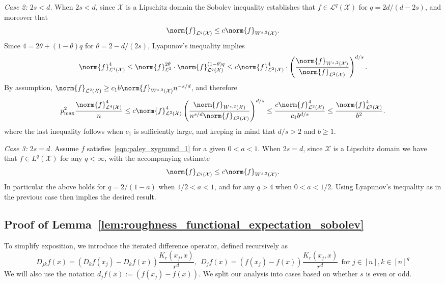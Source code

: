 \documentclass{article}
\newcommand{\1}{\mathbf{1}}
\newcommand{\Xset}{\mathcal{X}}
\newcommand{\Leb}{\mathcal{L}}
\theoremstyle{alden}
\theoremstyle{aldenthm}
\theoremstyle{definition}
\theoremstyle{remark}
\begin{document}
\textit{Case 2: $2s < d$.}
When $2s < d$, since $\Xset$ is a Lipschitz domain the Sobolev inequality establishes that $f \in \Leb^q(\Xset)$ for $q = 2d/(d - 2s)$, and moreover that
\begin{equation*}
\norm{f}_{\Leb^q(\Xset)} \leq c \norm{f}_{W^{s,2}(\Xset)}.
\end{equation*}
Since $4 = 2\theta + (1 - \theta)q$ for $\theta = 2 - d/(2s)$, Lyapunov's inequality implies
\begin{equation*}
\norm{f}_{\Leb^4(\Xset)}^4 \leq \norm{f}_{\Leb^2}^{2\theta} \cdot \norm{f}_{\Leb^q(\Xset)}^{(1 - \theta)q} \leq c \norm{f}_{\Leb^2(\Xset)}^{4} \cdot \left(\frac{\norm{f}_{W^{s,2}(\Xset)}}{\norm{f}_{\Leb^2(\Xset)}}\right)^{d/s}.
\end{equation*}
By assumption, $\norm{f}_{\Leb^2(\Xset)} \geq c_1 b \norm{f}_{W^{s,2}(\Xset)} n^{-s/d}$, and therefore
\begin{equation*}
p_{\max}^2 \frac{\norm{f}_{\Leb^4(\Xset)}^4}{n} \leq c\norm{f}_{\Leb^2(\Xset)}^4 \left(\frac{\norm{f}_{W^{s,2}(\Xset)}}{n^{s/d}\norm{f}_{\Leb^2(\Xset)}}\right)^{d/s} \leq \frac{c\norm{f}_{\Leb^2(\Xset)}^4}{c_1b^{d/s}} \leq \frac{\norm{f}_{\Leb^2(\Xset)}^4}{b^2}.
\end{equation*}
where the last inequality follows when $c_1$ is sufficiently large, and keeping in mind that $d/s > 2$ and $b \geq 1$. 

\textit{Case 3: $2s = d$.}
Assume $f$ satisfies~\eqref{eqn:paley_zygmund_1} for a given $0 < a < 1$. When $2s = d$, since $\Xset$ is a Lipschitz domain we have that $f \in L^q(\Xset)$ for any $q < \infty$, with the accompanying estimate
\begin{equation*}
\norm{f}_{\Leb^q(\Xset)} \leq c \norm{f}_{W^{s,2}(\Xset)}.
\end{equation*}
In particular the above holds for $q = 2/(1 - a)$ when $1/2 < a < 1$, and for any $q > 4$ when $0 < a < 1/2$. Using Lyapunov's inequality as in the previous case then implies the desired result.

\subsection{Proof of Lemma~\ref{lem:roughness_functional_expectation_sobolev}}
\label{sec:technical_lemma_proofs}

To simplify exposition, we introduce the iterated difference operator, defined recursively as
\begin{equation*}
D_{jk}f(x) = (D_{k}f(x_j) - D_{k}f(x))\frac{K_r(x_j,x)}{r^d},~~ D_jf(x) = (f(x_j) - f(x))\frac{K_r(x_j,x)}{r^d}~~ \textrm{for $j \in [n], k \in [n]^q$}
\end{equation*}
We will also use the notation $d_jf(x) := (f(x_j) - f(x))$. We split our analysis into cases based on whether $s$ is even or odd. 
\end{document}
